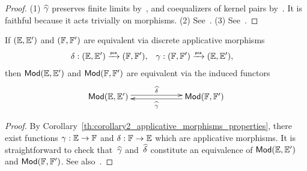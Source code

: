 \begin{proof}
  (1) $\widehat{\gamma}$ preserves finite limits
  by~\cite[Proposition~2.2.2]{Longley:94}, and coequalizers of kernel
  pairs by~\cite[Proposition~2.2.3]{Longley:94}. It is faithful
  because it acts trivially on morphisms.
  (2) See~\cite[Theorem~2.4.12]{Longley:94}.
  (3) See~\cite[Theorem~2.4.19]{Longley:94}.
\end{proof}


\begin{theorem}
  \label{th:applicative_morphisms_tfae}%
  If $({\mathbb{E}}, {\mathbb{E}'})$ and $({\mathbb{F}}, {\mathbb{F}'})$ are equivalent via discrete
  applicative morphisms
  \begin{align*}
    \delta &: ({\mathbb{E}}, {\mathbb{E}'}) \xrightarrow{\scriptscriptstyle\mathsf{pca}}{} ({\mathbb{F}}, {\mathbb{F}'}),
    &
    \gamma &: ({\mathbb{F}}, {\mathbb{F}'}) \xrightarrow{\scriptscriptstyle\mathsf{pca}}{} ({\mathbb{E}}, {\mathbb{E}'}),
  \end{align*}
  then $\mathsf{Mod}({\mathbb{E}}, {\mathbb{E}'})$ and $\mathsf{Mod}({\mathbb{F}}, {\mathbb{F}'})$ are equivalent
  via the induced functors
  \begin{equation*}
    \xymatrix{
      **[l]{\Mod{\EE, \subEE}} \ar@<0.5ex>[r]^{\ff{\delta}}
      &
      **[r]{\Mod{\FF, \subFF}} \ar@<0.5ex>[l]^{\ff{\gamma}}
      }
  \end{equation*}
\end{theorem}

\begin{proof}
  By Corollary~\ref{th:corollary2_applicative_morphisms_properties},
  there exist functions $\gamma: {\mathbb{E}} \to {\mathbb{F}}$ and $\delta: {\mathbb{F}} \to
  {\mathbb{E}}$ which are applicative morphisms. It is straightforward to check
  that~$\widehat{\gamma}$ and~$\widehat{\delta}$ constitute an equivalence of
  $\mathsf{Mod}({\mathbb{E}}, {\mathbb{E}'})$ and $\mathsf{Mod}({\mathbb{F}}, {\mathbb{F}'})$. See also~\cite[Theorem
  2.5.6]{Longley:94}.
\end{proof}


